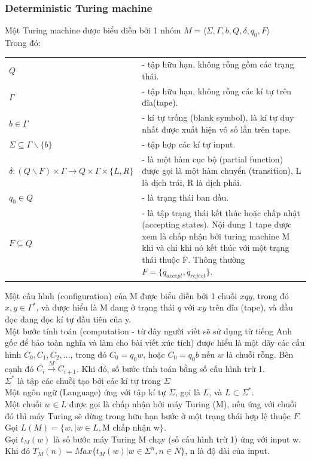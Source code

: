 \documentclass[a4paper 14pt]{article}
\begin{document}
			\subsubsection{Deterministic Turing machine}
				Một Turing machine được biểu diễn bởi 1 nhóm $M = \langle \Sigma, \Gamma, b, Q, \delta, q_0, F \rangle$\\
				Trong đó:\\
				\begin{tabular}{l p{4in}}
					$Q$& - tập hữu hạn, không rỗng gồm các trạng thái.\\
					$\Gamma$& - tập hữu hạn, không rỗng các kí tự trên đĩa(tape).\\
					$b \in \Gamma$& - kí tự trống (blank symbol), là kí tự duy nhất được xuất hiện vô số lần trên tape.\\
					$\Sigma \subseteq \Gamma \backslash \{b\}$& - tập hợp các kí tự input.\\
					$\delta: (Q \backslash F) \times \Gamma \to Q \times \Gamma \times \{L, R\} $& - là một hàm cục bộ (partial function) được gọi là một hàm chuyển (transition), L là dịch trái, R là dịch phải.\\
					$q_{0} \in Q$& - là trạng thái ban đầu.\\
					$F\subseteq Q$& - là tập trạng thái kết thúc hoặc chấp nhật (accepting states). Nội dung 1 tape được xem là chấp nhận bởi turing machine M khi và chỉ khi nó kết thúc với một trạng thái thuộc F. Thông thường $F = \{q_{accept}, q_{reject}\}$.\\
				\end{tabular}  
				Một cấu hình (configuration) của M được biểu diễn bởi 1 chuỗi $xqy$, trong đó $x, y \in \Gamma^{*}$, và được hiểu là M đang ở trạng thái $q$ với $xy$ trên đĩa (tape), và đầu đọc đang đọc kí tự đầu tiên của y.\\
				Một bước tính toán (computation - từ đây người viết sẽ sử dụng từ tiếng Anh gốc để bảo toàn nghĩa và làm cho bài viết xúc tích) được hiểu là một dãy các cấu hình $C_0, C_1, C_2, \hdots$, trong đó $C_0 = q_0w$, hoặc $C_0 = q_0b$ nếu $w$ là chuỗi rỗng. Bên cạnh đó $C_i \overset{M}{\to} C_{i+1}$. Khi đó, số bước tính toán bằng số cấu hình trừ 1.\\
				$\Sigma^*$ là tập các chuỗi tạo bởi các kí tự trong $\Sigma$\\
				Một ngôn ngữ (Language) ứng với tập kí tự $\Sigma$, gọi là $L$, và $L\subset \Sigma^*$.\\
				Một chuỗi $w \in L$ được gọi là chấp nhận bởi máy Turing (M), nếu ứng với chuỗi đó thì máy Turing sẽ dừng trong hữu hạn bước ở một trạng thái hợp lệ thuộc $F$.\\
				Gọi $L(M) = \{w, | w \in L,\text{M chấp nhận w} \}$.\\
				Gọi $t_M(w)$ là số bước máy Turing M chạy (số cấu hình trừ 1) ứng với input w.\\
				Khi đó $T_M(n) = Max\{t_M(w) | w \in \Sigma^n, n \in N\}$, n là độ dài của input. 
\end{document}
